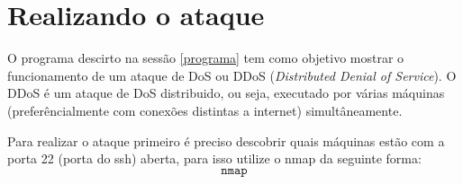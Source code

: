 \documentclass[12pt]{abnt}
\begin{document}
\section{Realizando o ataque}

O programa descirto na sessão \ref{programa} tem como objetivo mostrar o funcionamento de um ataque de
DoS ou DDoS (\textit{Distributed Denial of Service}). O DDoS é um ataque de DoS distribuido, ou seja,
executado por várias máquinas (preferêncialmente com conexões distintas a internet) simultâneamente.

Para realizar o ataque primeiro é preciso descobrir quais máquinas estão com a porta 22 (porta do ssh)
aberta, para isso utilize o nmap da seguinte forma: $$\texttt{nmap}$$
\clearpage

\end{document}
